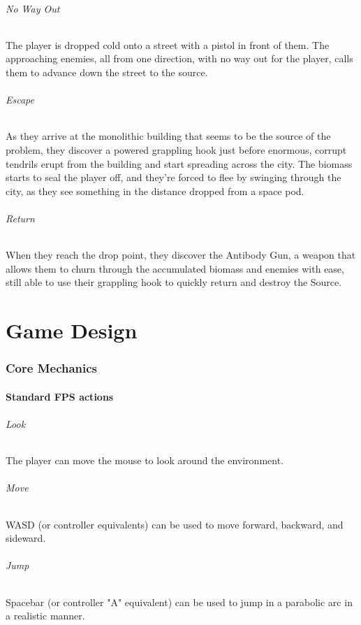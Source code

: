 \documentclass[letterpaper]{report}
\begin{document}
				\paragraph{No Way Out} The player is dropped cold onto a street with a pistol in front of them. The approaching enemies, all from one direction, with no way out for the player, calls them to advance down the street to the source.
				\paragraph{Escape} As they arrive at the monolithic building that seems to be the source of the problem, they discover a powered grappling hook just before enormous, corrupt tendrils erupt from the building and start spreading across the city. The biomass starts to seal the player off, and they're forced to flee by swinging through the city, as they see something in the distance dropped from a space pod.
				\paragraph{Return} When they reach the drop point, they discover the Antibody Gun, a weapon that allows them to churn through the accumulated biomass and enemies with ease, still able to use their grappling hook to quickly return and destroy the Source.

\part{Game Design}
	\section{Core Mechanics}
		\subsection{Standard FPS actions}
			\paragraph{Look} The player can move the mouse to look around the environment.
			\paragraph{Move} WASD (or controller equivalents) can be used to move forward, backward, and sideward.
			\paragraph{Jump} Spacebar (or controller "A" equivalent) can be used to jump in a parabolic arc in a realistic manner.
\end{document}
